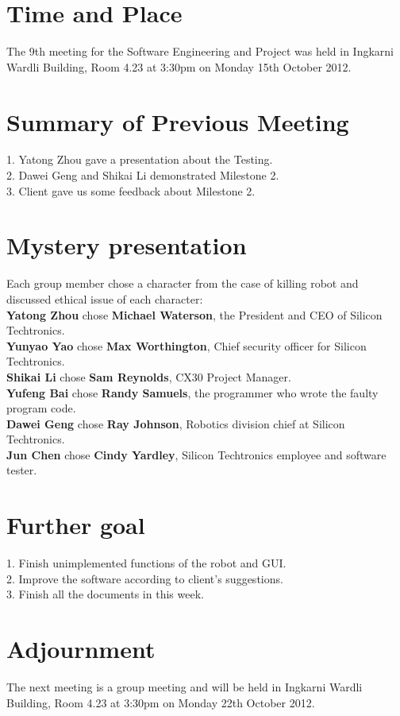 \documentclass[11pt, a4paper]{article}
\begin{document}
\section{Time and Place}
The 9th meeting for the Software Engineering and Project was held in Ingkarni Wardli Building, Room     4.23 at 3:30pm on Monday 15th October 2012.



\section{Summary of Previous Meeting}
1. Yatong Zhou gave a presentation about the Testing.\\
2. Dawei Geng and Shikai Li demonstrated Milestone 2.\\
3. Client gave us some feedback about Milestone 2.\\


\section{Mystery presentation}
Each group member chose a character from the case of killing robot and discussed ethical issue of each character:\\[0.5cm]
\textbf{Yatong Zhou} chose \textbf{Michael Waterson}, the President and CEO of Silicon Techtronics.\\
\textbf{Yunyao Yao} chose \textbf{Max Worthington}, Chief security officer for Silicon Techtronics.\\
\textbf{Shikai Li} chose \textbf{Sam Reynolds}, CX30 Project Manager.\\
\textbf{Yufeng Bai} chose \textbf{Randy Samuels}, the programmer who wrote the faulty program code.\\
\textbf{Dawei Geng} chose \textbf{Ray Johnson}, Robotics division chief at Silicon Techtronics.\\
\textbf{Jun Chen} chose \textbf{Cindy Yardley}, Silicon Techtronics employee and software tester.\\



\section{Further goal}
1. Finish unimplemented functions of the robot and GUI.\\
2. Improve the software according to client's suggestions.\\
3. Finish all the documents in this week.

\section{Adjournment}
The next meeting is a group meeting and will be held in Ingkarni Wardli Building, Room 4.23 at 3:30pm on Monday 22th October 2012.

\vspace*{10pt}
\end{document}
